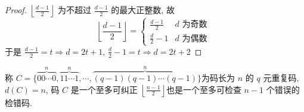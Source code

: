 \begin{proof}
  $ \left\lfloor\frac{d-1}{2}\right\rfloor $ 为不超过 $ \frac{d-1}{2} $ 的最大正整数,
故
$$
\left\lfloor\frac{d-1}{2}\right\rfloor=\left\{\begin{array}{ll}
\frac{d-1}{2} & d \text { 为奇数 } \\
\frac{d}{2}-1 & d \text { 为偶数 }
\end{array}\right.
$$
于是 $ \frac{d-1}{2}=t \Longrightarrow d=2 t+1 $,
$\frac{d}{2}-1=t \Longrightarrow d=2 t+2$
\end{proof}

\begin{example}
 称 $ C=\{\overbrace{00 \cdots 0}^{n}, \overbrace{11 \cdots 1}^{n}, \cdots, \overbrace{(q-1)(q-1) \cdots(q-1)}^{n}\} $为码长为 $ n $ 的 $ q $ 元重复码, $ d(C)=n $, 码 $ C $ 是一个至多可纠正 $ \left\lfloor\frac{n-1}{2}\right\rfloor $也是一个至多可检查 $ n-1 $ 个错误的检错码.
\end{example}
